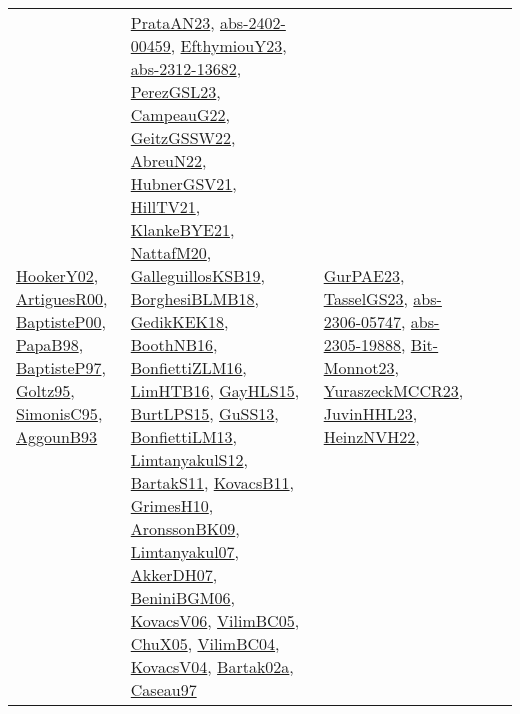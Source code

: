 {\begin{longtable}{lp{3cm}>{\raggedright}p{6cm}>{\raggedright}p{6cm}p{8cm}}
\href{papers/HookerY02.pdf}{HookerY02}\cite{HookerY02}, \href{articles/ArtiguesR00.pdf}{ArtiguesR00}\cite{ArtiguesR00}, \href{articles/BaptisteP00.pdf}{BaptisteP00}\cite{BaptisteP00}, \href{articles/PapaB98.pdf}{PapaB98}\cite{PapaB98}, \href{papers/BaptisteP97.pdf}{BaptisteP97}\cite{BaptisteP97}, \href{papers/Goltz95.pdf}{Goltz95}\cite{Goltz95}, \href{papers/SimonisC95.pdf}{SimonisC95}\cite{SimonisC95}, \href{articles/AggounB93.pdf}{AggounB93}\cite{AggounB93} & \href{articles/PrataAN23.pdf}{PrataAN23}\cite{PrataAN23}, \href{articles/abs-2402-00459.pdf}{abs-2402-00459}\cite{abs-2402-00459}, \href{papers/EfthymiouY23.pdf}{EfthymiouY23}\cite{EfthymiouY23}, \href{articles/abs-2312-13682.pdf}{abs-2312-13682}\cite{abs-2312-13682}, \href{papers/PerezGSL23.pdf}{PerezGSL23}\cite{PerezGSL23}, \href{articles/CampeauG22.pdf}{CampeauG22}\cite{CampeauG22}, \href{papers/GeitzGSSW22.pdf}{GeitzGSSW22}\cite{GeitzGSSW22}, \href{articles/AbreuN22.pdf}{AbreuN22}\cite{AbreuN22}, \href{articles/HubnerGSV21.pdf}{HubnerGSV21}\cite{HubnerGSV21}, \href{papers/HillTV21.pdf}{HillTV21}\cite{HillTV21}, \href{papers/KlankeBYE21.pdf}{KlankeBYE21}\cite{KlankeBYE21}, \href{papers/NattafM20.pdf}{NattafM20}\cite{NattafM20}, \href{papers/GalleguillosKSB19.pdf}{GalleguillosKSB19}\cite{GalleguillosKSB19}, \href{articles/BorghesiBLMB18.pdf}{BorghesiBLMB18}\cite{BorghesiBLMB18}, \href{articles/GedikKEK18.pdf}{GedikKEK18}\cite{GedikKEK18}, \href{papers/BoothNB16.pdf}{BoothNB16}\cite{BoothNB16}, \href{papers/BonfiettiZLM16.pdf}{BonfiettiZLM16}\cite{BonfiettiZLM16}, \href{papers/LimHTB16.pdf}{LimHTB16}\cite{LimHTB16}, \href{papers/GayHLS15.pdf}{GayHLS15}\cite{GayHLS15}, \href{papers/BurtLPS15.pdf}{BurtLPS15}\cite{BurtLPS15}, \href{papers/GuSS13.pdf}{GuSS13}\cite{GuSS13}, \href{papers/BonfiettiLM13.pdf}{BonfiettiLM13}\cite{BonfiettiLM13}, \href{articles/LimtanyakulS12.pdf}{LimtanyakulS12}\cite{LimtanyakulS12}, \href{articles/BartakS11.pdf}{BartakS11}\cite{BartakS11}, \href{articles/KovacsB11.pdf}{KovacsB11}\cite{KovacsB11}, \href{papers/GrimesH10.pdf}{GrimesH10}\cite{GrimesH10}, \href{papers/AronssonBK09.pdf}{AronssonBK09}\cite{AronssonBK09}, \href{papers/Limtanyakul07.pdf}{Limtanyakul07}\cite{Limtanyakul07}, \href{papers/AkkerDH07.pdf}{AkkerDH07}\cite{AkkerDH07}, \href{papers/BeniniBGM06.pdf}{BeniniBGM06}\cite{BeniniBGM06}, \href{papers/KovacsV06.pdf}{KovacsV06}\cite{KovacsV06}, \href{articles/VilimBC05.pdf}{VilimBC05}\cite{VilimBC05}, \href{papers/ChuX05.pdf}{ChuX05}\cite{ChuX05}, \href{papers/VilimBC04.pdf}{VilimBC04}\cite{VilimBC04}, \href{papers/KovacsV04.pdf}{KovacsV04}\cite{KovacsV04}, \href{papers/Bartak02a.pdf}{Bartak02a}\cite{Bartak02a}, \href{papers/Caseau97.pdf}{Caseau97}\cite{Caseau97} & \href{articles/GurPAE23.pdf}{GurPAE23}\cite{GurPAE23}, \href{papers/TasselGS23.pdf}{TasselGS23}\cite{TasselGS23}, \href{articles/abs-2306-05747.pdf}{abs-2306-05747}\cite{abs-2306-05747}, \href{articles/abs-2305-19888.pdf}{abs-2305-19888}\cite{abs-2305-19888}, \href{papers/Bit-Monnot23.pdf}{Bit-Monnot23}\cite{Bit-Monnot23}, \href{articles/YuraszeckMCCR23.pdf}{YuraszeckMCCR23}\cite{YuraszeckMCCR23}, \href{papers/JuvinHHL23.pdf}{JuvinHHL23}\cite{JuvinHHL23}, \href{articles/HeinzNVH22.pdf}{HeinzNVH22}\cite{HeinzNVH22}, 
\end{longtable}}
